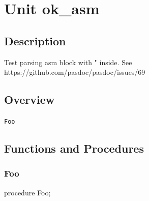 \documentclass{report}
\begin{document}
\newlength{\tmplength}
\chapter{Unit ok{\_}asm}
\section{Description}
Test parsing asm block with " inside. See https://github.com/pasdoc/pasdoc/issues/69
\section{Overview}
\begin{description}
\item[\texttt{Foo}]
\end{description}
\section{Functions and Procedures}
\subsection*{Foo}
\begin{list}{}{
\setlength{\itemindent}{0cm}
\setlength{\listparindent}{0cm}
\setlength{\leftmargin}{\evensidemargin}
\addtolength{\leftmargin}{\tmplength}
\settowidth{\labelsep}{X}
\addtolength{\leftmargin}{\labelsep}
\setlength{\labelwidth}{\tmplength}
}
\begin{flushleft}
\item[\textbf{Declaration}\hfill]
\begin{ttfamily}
procedure Foo;\end{ttfamily}


\end{flushleft}
\end{list}
\end{document}
